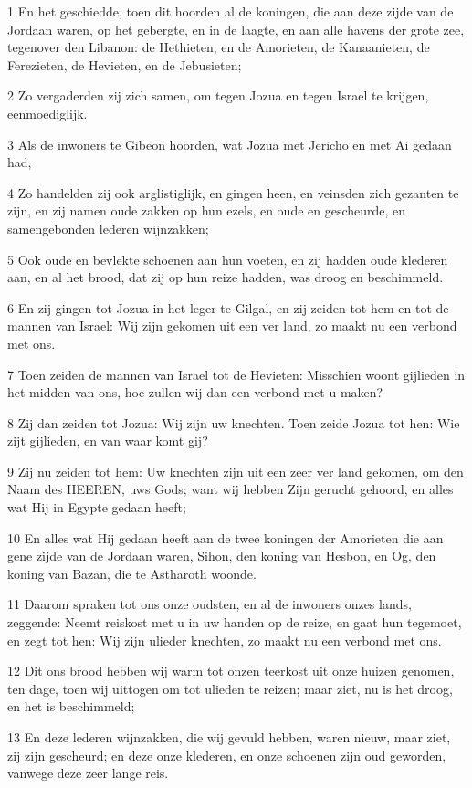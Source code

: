 \par 1 En het geschiedde, toen dit hoorden al de koningen, die aan deze zijde van de Jordaan waren, op het gebergte, en in de laagte, en aan alle havens der grote zee, tegenover den Libanon: de Hethieten, en de Amorieten, de Kanaanieten, de Ferezieten, de Hevieten, en de Jebusieten;
\par 2 Zo vergaderden zij zich samen, om tegen Jozua en tegen Israel te krijgen, eenmoediglijk.
\par 3 Als de inwoners te Gibeon hoorden, wat Jozua met Jericho en met Ai gedaan had,
\par 4 Zo handelden zij ook arglistiglijk, en gingen heen, en veinsden zich gezanten te zijn, en zij namen oude zakken op hun ezels, en oude en gescheurde, en samengebonden lederen wijnzakken;
\par 5 Ook oude en bevlekte schoenen aan hun voeten, en zij hadden oude klederen aan, en al het brood, dat zij op hun reize hadden, was droog en beschimmeld.
\par 6 En zij gingen tot Jozua in het leger te Gilgal, en zij zeiden tot hem en tot de mannen van Israel: Wij zijn gekomen uit een ver land, zo maakt nu een verbond met ons.
\par 7 Toen zeiden de mannen van Israel tot de Hevieten: Misschien woont gijlieden in het midden van ons, hoe zullen wij dan een verbond met u maken?
\par 8 Zij dan zeiden tot Jozua: Wij zijn uw knechten. Toen zeide Jozua tot hen: Wie zijt gijlieden, en van waar komt gij?
\par 9 Zij nu zeiden tot hem: Uw knechten zijn uit een zeer ver land gekomen, om den Naam des HEEREN, uws Gods; want wij hebben Zijn gerucht gehoord, en alles wat Hij in Egypte gedaan heeft;
\par 10 En alles wat Hij gedaan heeft aan de twee koningen der Amorieten die aan gene zijde van de Jordaan waren, Sihon, den koning van Hesbon, en Og, den koning van Bazan, die te Astharoth woonde.
\par 11 Daarom spraken tot ons onze oudsten, en al de inwoners onzes lands, zeggende: Neemt reiskost met u in uw handen op de reize, en gaat hun tegemoet, en zegt tot hen: Wij zijn ulieder knechten, zo maakt nu een verbond met ons.
\par 12 Dit ons brood hebben wij warm tot onzen teerkost uit onze huizen genomen, ten dage, toen wij uittogen om tot ulieden te reizen; maar ziet, nu is het droog, en het is beschimmeld;
\par 13 En deze lederen wijnzakken, die wij gevuld hebben, waren nieuw, maar ziet, zij zijn gescheurd; en deze onze klederen, en onze schoenen zijn oud geworden, vanwege deze zeer lange reis.
